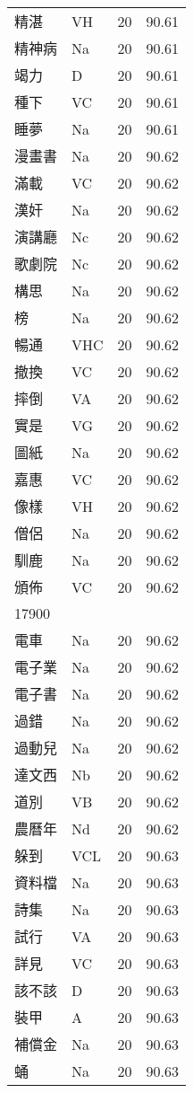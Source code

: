 \documentclass[twocolumn]{book}
\begin{document}
\begin{supertabular}{llrr}
精湛 & VH & 20 &  90.61\\
精神病 & Na & 20 &  90.61\\
竭力 & D & 20 &  90.61\\
種下 & VC & 20 &  90.61\\
睡夢 & Na & 20 &  90.61\\
漫畫書 & Na & 20 &  90.62\\
滿載 & VC & 20 &  90.62\\
漢奸 & Na & 20 &  90.62\\
演講廳 & Nc & 20 &  90.62\\
歌劇院 & Nc & 20 &  90.62\\
構思 & Na & 20 &  90.62\\
榜 & Na & 20 &  90.62\\
暢通 & VHC & 20 &  90.62\\
撤換 & VC & 20 &  90.62\\
摔倒 & VA & 20 &  90.62\\
實是 & VG & 20 &  90.62\\
圖紙 & Na & 20 &  90.62\\
嘉惠 & VC & 20 &  90.62\\
像樣 & VH & 20 &  90.62\\
僧侶 & Na & 20 &  90.62\\
馴鹿 & Na & 20 &  90.62\\
頒佈 & VC & 20 &  90.62\\
17900\\
電車 & Na & 20 &  90.62\\
電子業 & Na & 20 &  90.62\\
電子書 & Na & 20 &  90.62\\
過錯 & Na & 20 &  90.62\\
過動兒 & Na & 20 &  90.62\\
達文西 & Nb & 20 &  90.62\\
道別 & VB & 20 &  90.62\\
農曆年 & Nd & 20 &  90.62\\
躲到 & VCL & 20 &  90.63\\
資料檔 & Na & 20 &  90.63\\
詩集 & Na & 20 &  90.63\\
試行 & VA & 20 &  90.63\\
詳見 & VC & 20 &  90.63\\
該不該 & D & 20 &  90.63\\
裝甲 & A & 20 &  90.63\\
補償金 & Na & 20 &  90.63\\
蛹 & Na & 20 &  90.63\\

\end{supertabular}
\end{document}
